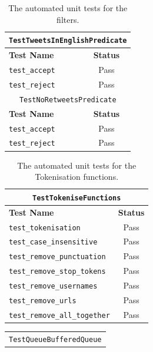 \documentclass[11pt,a4paper]{report}
\begin{document}
\begin{subappendices}
\begin{table}[htpb]
\begin{tabular}{|l|c|}
        \hline
        \multicolumn{2}{|c|}{\texttt{TestTweetsInEnglishPredicate}} \\
        \hline
        \textbf{Test Name} & \textbf{Status} \\
        \hline
        \verb+test_accept+ & \cellcolor{green!25}Pass \\
        \verb+test_reject+ & \cellcolor{green!25}Pass \\
        \hline
        \multicolumn{2}{|c|}{\texttt{TestNoRetweetsPredicate}} \\
        \hline
        \textbf{Test Name} & \textbf{Status} \\
        \hline
        \verb+test_accept+ & \cellcolor{green!25}Pass \\
        \verb+test_reject+ & \cellcolor{green!25}Pass \\
        \hline
    \end{tabular}
    \caption*{The automated unit tests for the filters.}
\end{table}
\begin{table}[htpb]
    \centering
    \begin{tabular}{|l|c|}
        \hline
        \multicolumn{2}{|c|}{\texttt{TestTokeniseFunctions}} \\
        \hline
        \textbf{Test Name} & \textbf{Status} \\
        \hline
        \verb+test_tokenisation+ & \cellcolor{green!25}Pass \\
        \verb+test_case_insensitive+ & \cellcolor{green!25}Pass \\
        \verb+test_remove_punctuation+ & \cellcolor{green!25}Pass \\
        \verb+test_remove_stop_tokens+ & \cellcolor{green!25}Pass \\
        \verb+test_remove_usernames+ & \cellcolor{green!25}Pass \\
        \verb+test_remove_urls+ & \cellcolor{green!25}Pass \\
        \verb+test_remove_all_together+ & \cellcolor{green!25}Pass \\
        \hline
    \end{tabular}
    \caption*{The automated unit tests for the Tokenisation functions.}
\end{table}
\begin{table}[htpb]
    \centering
    \begin{tabular}{|l|c|}
        \hline
        \multicolumn{2}{|c|}{\texttt{TestQueueBufferedQueue}} \\

\end{tabular}
\end{table}
\end{subappendices}
\end{document}
